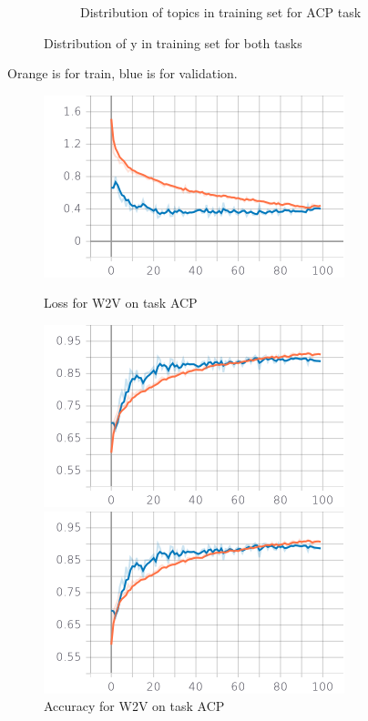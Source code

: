 \documentclass{article}
\begin{document}
\begin{figure}
\begin{subfigure}{.33\textwidth}
 		            \caption{Distribution of topics in training set for ACP task}
 		            \label{acp_y_train_historgram3}
		        \end{subfigure}
		    \caption{Distribution of y in training set for both tasks}
		    \label{y_train_histograms4}
	    \end{figure}

            \color{orange} Orange is for train, \color{blue} blue is for validation.\color{black}
            \begin{figure}[!htb]
                \begin{minipage}{0.48\textwidth}
                    \centering
                    \includegraphics[width=.7\linewidth]{w2v_acp_epoch_loss.png}
                    \caption{Loss for W2V on task ACP}\label{Fig:Data1}
                \end{minipage}\hfill
                \begin{minipage}{0.48\textwidth}
                    \centering
                    \includegraphics[width=.7\linewidth]{w2v_acp_epoch_accuracy.png}
                    \caption{Accuracy for W2V on task ACP}\label{Fig:Data2}
                \end{minipage}
                \begin{minipage}{0.48\textwidth}
                    \centering
                    \includegraphics[width=.7\linewidth]{w2v_acp_epoch_recall.png}

\end{minipage}
\end{figure}
\end{document}

